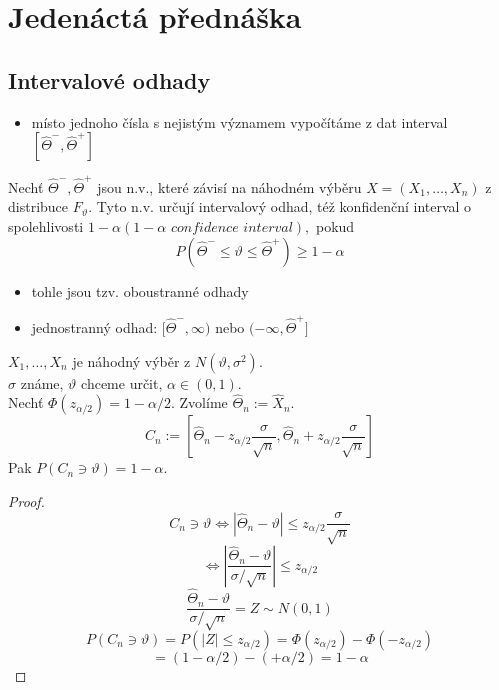 \documentclass[../main.tex]{subfiles}
\begin{document}
\section{Jedenáctá přednáška}

\subsection{Intervalové odhady}
\begin{itemize}
    \item místo jednoho čísla s nejistým významem vypočítáme z dat interval $\left[\widehat{\Theta}^-, \widehat{\Theta}^+\right]$
\end{itemize}

\begin{definition}
    Nechť $\widehat{\Theta}^-, \widehat{\Theta}^+$ jsou n.v.,
    které závisí na náhodném výběru 
    $X = (X_1,\dots,X_n)$ z distribuce $F_{\vartheta}$. Tyto n.v. určují intervalový odhad, též konfidenční interval o spolehlivosti
    $1-\alpha (1-\alpha \textit{ confidence interval}),$ pokud 
    \[P(\widehat{\Theta}^- \leq \vartheta \leq \widehat{\Theta}^+) \geq 1 - \alpha\]
    \begin{itemize}
        \item tohle jsou tzv. oboustranné odhady
        \item jednostranný odhad: $[\widehat{\Theta}^-, \infty)$ nebo $(-\infty, \widehat{\Theta}^+]$
    \end{itemize}
\end{definition}

\begin{theorem}
    $X_1,\dots,X_n$ je náhodný výběr z $N(\vartheta, \sigma^2)$.\\
    $\sigma$ známe, $\vartheta$ chceme určit, $\alpha \in (0,1)$.\\
    Nechť $\Phi(z_{\alpha/2}) = 1 - \alpha / 2$. Zvolíme $\widehat{\Theta}_n := \widehat{X}_n$.
    \[C_n := \left[\widehat{\Theta}_n - z_{\alpha/2}\frac{\sigma}{\sqrt{n}}, \widehat{\Theta}_n + z_{\alpha/2}\frac{\sigma}{\sqrt{n}}\right]\]
    Pak $P(C_n \ni \vartheta) = 1 - \alpha$.
\end{theorem}
\begin{proof}
    \[C_n \ni \vartheta \Leftrightarrow |\widehat{\Theta}_n - \vartheta | \leq z_{\alpha/2}\frac{\sigma}{\sqrt{n}}\]
    \[\Leftrightarrow \left|\frac{\widehat{\Theta}_n - \vartheta}{\sigma/\sqrt{n}}\right| \leq z_{\alpha/2}\]
    \[ \frac{\widehat{\Theta}_n - \vartheta}{\sigma/\sqrt{n}} = Z \sim N(0,1)\]
    \[P(C_n \ni \vartheta) = P(|Z| \leq z_{\alpha/2}) = \Phi(z_{\alpha/2}) - \Phi(-z_{\alpha/2})\]
    \[= (1- \alpha/2) - (+ \alpha/2) = 1 - \alpha\]
\end{proof}
\end{document}
